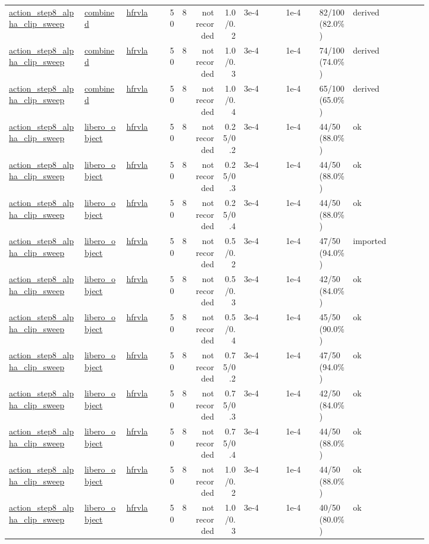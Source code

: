 \begin{tiny}
\begin{longtable}{@{}p{0.18\linewidth}p{0.10\linewidth}p{0.10\linewidth}rrrrp{0.10\linewidth}p{0.08\linewidth}p{0.08\linewidth}p{0.11\linewidth}p{0.07\linewidth}@{}}
\url{action_step8_alpha_clip_sweep} & \url{combined} & \url{hfrvla} & 50 & 8 & not recorded & 1.0/0.2 & 3e-4 & 1e-4 & 82/100 (82.0\%) & derived \\
\url{action_step8_alpha_clip_sweep} & \url{combined} & \url{hfrvla} & 50 & 8 & not recorded & 1.0/0.3 & 3e-4 & 1e-4 & 74/100 (74.0\%) & derived \\
\url{action_step8_alpha_clip_sweep} & \url{combined} & \url{hfrvla} & 50 & 8 & not recorded & 1.0/0.4 & 3e-4 & 1e-4 & 65/100 (65.0\%) & derived \\
\url{action_step8_alpha_clip_sweep} & \url{libero_object} & \url{hfrvla} & 50 & 8 & not recorded & 0.25/0.2 & 3e-4 & 1e-4 & 44/50 (88.0\%) & ok \\
\url{action_step8_alpha_clip_sweep} & \url{libero_object} & \url{hfrvla} & 50 & 8 & not recorded & 0.25/0.3 & 3e-4 & 1e-4 & 44/50 (88.0\%) & ok \\
\url{action_step8_alpha_clip_sweep} & \url{libero_object} & \url{hfrvla} & 50 & 8 & not recorded & 0.25/0.4 & 3e-4 & 1e-4 & 44/50 (88.0\%) & ok \\
\url{action_step8_alpha_clip_sweep} & \url{libero_object} & \url{hfrvla} & 50 & 8 & not recorded & 0.5/0.2 & 3e-4 & 1e-4 & 47/50 (94.0\%) & imported \\
\url{action_step8_alpha_clip_sweep} & \url{libero_object} & \url{hfrvla} & 50 & 8 & not recorded & 0.5/0.3 & 3e-4 & 1e-4 & 42/50 (84.0\%) & ok \\
\url{action_step8_alpha_clip_sweep} & \url{libero_object} & \url{hfrvla} & 50 & 8 & not recorded & 0.5/0.4 & 3e-4 & 1e-4 & 45/50 (90.0\%) & ok \\
\url{action_step8_alpha_clip_sweep} & \url{libero_object} & \url{hfrvla} & 50 & 8 & not recorded & 0.75/0.2 & 3e-4 & 1e-4 & 47/50 (94.0\%) & ok \\
\url{action_step8_alpha_clip_sweep} & \url{libero_object} & \url{hfrvla} & 50 & 8 & not recorded & 0.75/0.3 & 3e-4 & 1e-4 & 42/50 (84.0\%) & ok \\
\url{action_step8_alpha_clip_sweep} & \url{libero_object} & \url{hfrvla} & 50 & 8 & not recorded & 0.75/0.4 & 3e-4 & 1e-4 & 44/50 (88.0\%) & ok \\
\url{action_step8_alpha_clip_sweep} & \url{libero_object} & \url{hfrvla} & 50 & 8 & not recorded & 1.0/0.2 & 3e-4 & 1e-4 & 44/50 (88.0\%) & ok \\
\url{action_step8_alpha_clip_sweep} & \url{libero_object} & \url{hfrvla} & 50 & 8 & not recorded & 1.0/0.3 & 3e-4 & 1e-4 & 40/50 (80.0\%) & ok \\

\end{longtable}
\end{tiny}
